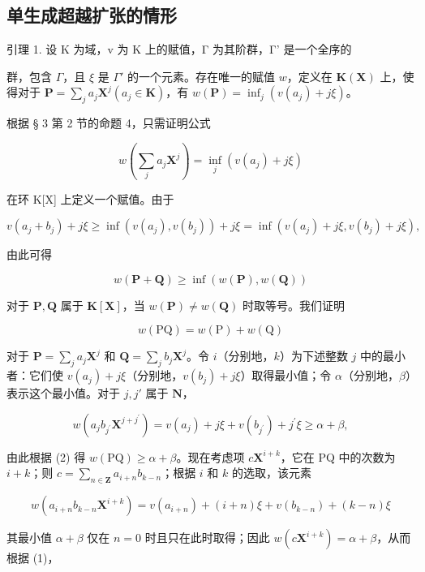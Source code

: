 \subsection{单生成超越扩张的情形}

引理 1. 设 K 为域，v 为 K 上的赋值，Γ 为其阶群，Γ' 是一个全序的

群，包含 \(\Gamma\)，且 \(\xi\) 是 \(\Gamma'\) 的一个元素。存在唯一的赋值 \(w\)，定义在 \(\mathbf{K}(\mathbf{X})\) 上，使得对于 \(\mathbf{P} = \sum_{j} a_j \mathbf{X}^j (a_j \in \mathbf{K})\)，有 \(w(\mathbf{P}) = \inf_j(v(a_j) + j\xi)\)。

根据 § 3 第 2 节的命题 4，只需证明公式

\[
w \left(\sum_ {j} a _ {j} \mathbf {X} ^ {j}\right) = \inf _ {j} (v (a _ {j}) + j \xi)\tag{1}
\]

在环 K{[}X{]} 上定义一个赋值。由于

\[
v \left(a _ {j} + b _ {j}\right) + j \xi \geqslant \inf (v \left(a _ {j}\right), v \left(b _ {j}\right)) + j \xi = \inf (v \left(a _ {j}\right) + j \xi , v \left(b _ {j}\right) + j \xi),
\]

由此可得

\[
w (\mathbf {P} + \mathbf {Q}) \geqslant \inf (w (\mathbf {P}), w (\mathbf {Q}))\tag{2}
\]

对于 \(\mathbf{P},\mathbf{Q}\) 属于 \(\mathbf{K}[\mathbf{X}]\)，当 \(w(\mathbf{P})\neq w(\mathbf{Q})\) 时取等号。我们证明

\[
w (\mathrm{PQ}) = w (\mathrm{P}) + w (\mathrm{Q})\tag{3}
\]

对于 \(\mathbf{P} = \sum_{j} a_{j} \mathbf{X}^{j}\) 和 \(\mathbf{Q} = \sum_{j} b_{j} \mathbf{X}^{j}\)。令 \(i\)（分别地，\(k\)）为下述整数 \(j\) 中的最小者：它们使 \(v(a_{j}) + j\xi\)（分别地，\(v(b_{j}) + j\xi\)）取得最小值；令 \(\alpha\)（分别地，\(\beta\)）表示这个最小值。对于 \(j, j'\) 属于 \(\mathbf{N}\)，

\[
w (a _ {j} b _ {j ^ {\prime}} \mathbf {X} ^ {j + j ^ {\prime}}) = v (a _ {j}) + j \xi + v (b _ {j ^ {\prime}}) + j ^ {\prime} \xi \geqslant \alpha + \beta ,
\]

由此根据 (2) 得 \(w(\mathrm{PQ}) \geqslant \alpha + \beta\)。现在考虑项 \(c\mathbf{X}^{i + k}\)，它在 PQ 中的次数为 \(i + k\)；则 \(c = \sum_{n \in \mathbf{Z}} a_{i + n} b_{k - n}\)；根据 \(i\) 和 \(k\) 的选取，该元素

\[
w (a _ {i + n} b _ {k - n} \mathbf {X} ^ {i + k}) = v (a _ {i + n}) + (i + n) \xi + v (b _ {k - n}) + (k - n) \xi
\]

其最小值 \(\alpha + \beta\) 仅在 \(n = 0\) 时且只在此时取得；因此 \(w(c\mathbf{X}^{i + k}) = \alpha + \beta\)，从而根据 (1)，

